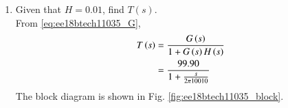 \begin{enumerate}[label=\arabic*.,ref=\theenumi]
%
%
%
%
%
%
%
%
%
%

\item Given that $H = 0.01$, find $T(s)$.\\
\solution From \eqref{eq:ee18btech11035_G},
\begin{align}
    T\left(s\right)&=\frac{G\left(s\right)}{1+G\left(s\right)H\left(s\right)}
\\
   &=\frac{99.90}{1+\frac{s}{2\pi 10010}}
\label{eq:ee18btech11035_T}
\end{align}
%
The block diagram is shown in Fig. \ref{fig:ee18btech11035_block}.
%


\end{enumerate}
